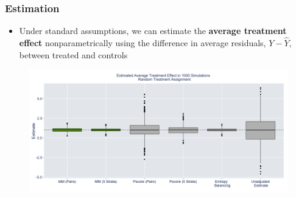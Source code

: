 \documentclass{beamer}
\begin{document}
\frame
{
  \frametitle{Estimation}
\begin{center}
\begin{itemize}
\item Under standard assumptions, we can estimate the \textbf{average treatment effect} nonparametrically using the difference in average residuals, $Y - \hat{Y}$, between treated and controls
\end{itemize}

\begin{figure}[htbp]
\begin{center}
\includegraphics[width = \textwidth]{fig/estimates.png}

\end{center}
\end{figure}


\end{center}
}

%
%
%
\end{document}

